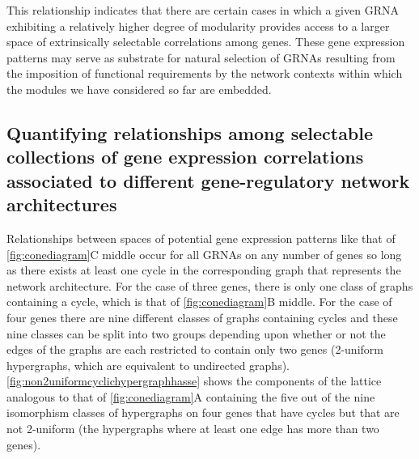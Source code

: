This relationship indicates that there are certain cases in which a given GRNA exhibiting a relatively higher degree of modularity provides access to a larger space of extrinsically selectable correlations among genes. These gene expression patterns may serve as substrate for natural selection of GRNAs resulting from the imposition of functional requirements by the network contexts within which the modules we have considered so far are embedded.

\subsection{Quantifying relationships among selectable collections of gene expression correlations associated to different gene-regulatory network architectures}
Relationships between spaces of potential gene expression patterns like that of \ref{fig:conediagram}C middle occur for all GRNAs on any number of genes so long as there exists at least one cycle in the corresponding graph that represents the network architecture. For the case of three genes, there is only one class of graphs containing a cycle, which is that of \ref{fig:conediagram}B middle. For the case of four genes there are nine different classes of graphs containing cycles and these nine classes can be split into two groups depending upon whether or not the edges of the graphs are each restricted to contain only two genes (2-uniform hypergraphs, which are equivalent to undirected graphs). \ref{fig:non2uniformcyclichypergraphhasse} shows the components of the lattice analogous to that of \ref{fig:conediagram}A containing the five out of the nine isomorphism classes of hypergraphs on four genes that have cycles but that are not 2-uniform (the hypergraphs where at least one edge has more than two genes).

